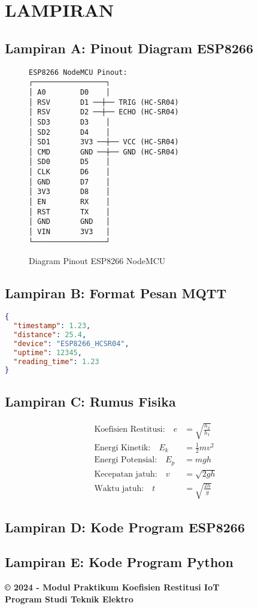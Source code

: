 \documentclass[12pt,a4paper]{article}
\begin{document}
\section{LAMPIRAN}

\subsection{Lampiran A: Pinout Diagram ESP8266}
\begin{figure}[H]
\centering
\begin{verbatim}
ESP8266 NodeMCU Pinout:
┌─────────────────┐
│ A0        D0    │
│ RSV       D1 ──┼── TRIG (HC-SR04)
│ RSV       D2 ──┼── ECHO (HC-SR04)  
│ SD3       D3    │
│ SD2       D4    │
│ SD1       3V3 ──┼── VCC (HC-SR04)
│ CMD       GND ──┼── GND (HC-SR04)
│ SD0       D5    │
│ CLK       D6    │
│ GND       D7    │
│ 3V3       D8    │
│ EN        RX    │
│ RST       TX    │
│ GND       GND   │
│ VIN       3V3   │
└─────────────────┘
\end{verbatim}
\caption{Diagram Pinout ESP8266 NodeMCU}
\end{figure}

\subsection{Lampiran B: Format Pesan MQTT}
\begin{lstlisting}[language=json, caption=Format JSON MQTT Message]
{
  "timestamp": 1.23,
  "distance": 25.4,
  "device": "ESP8266_HCSR04",
  "uptime": 12345,
  "reading_time": 1.23
}
\end{lstlisting}

\subsection{Lampiran C: Rumus Fisika}
\begin{align}
\text{Koefisien Restitusi:} \quad e &= \sqrt{\frac{h_2}{h_1}} \\
\text{Energi Kinetik:} \quad E_k &= \frac{1}{2}mv^2 \\
\text{Energi Potensial:} \quad E_p &= mgh \\
\text{Kecepatan jatuh:} \quad v &= \sqrt{2gh} \\
\text{Waktu jatuh:} \quad t &= \sqrt{\frac{2h}{g}}
\end{align}

\subsection{Lampiran D: Kode Program ESP8266}


\subsection{Lampiran E: Kode Program Python}


\vfill
\centering
\textbf{© 2024 - Modul Praktikum Koefisien Restitusi IoT}\\
\textbf{Program Studi Teknik Elektro}
\end{document}
